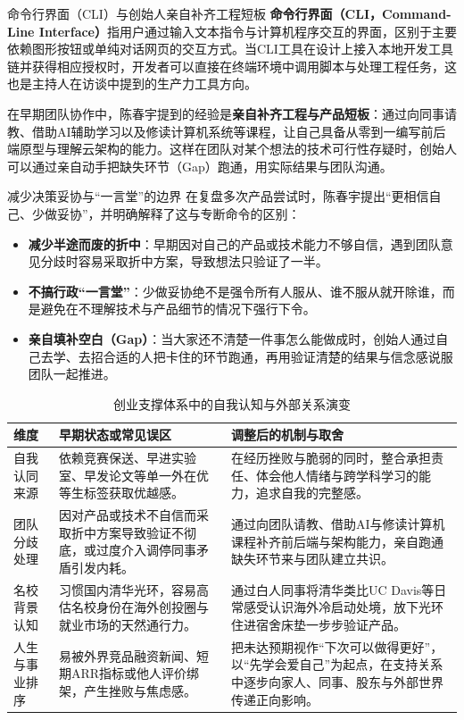\documentclass[UTF8,a4paper,11pt,fontset=fandol]{ctexart}
\begin{document}
\begin{knowledgebox}{命令行界面（CLI）与创始人亲自补齐工程短板}
\textbf{命令行界面（CLI，Command-Line Interface）}指用户通过输入文本指令与计算机程序交互的界面，区别于主要依赖图形按钮或单纯对话网页的交互方式。当CLI工具在设计上接入本地开发工具链并获得相应授权时，开发者可以直接在终端环境中调用脚本与处理工程任务，这也是主持人在访谈中提到的生产力工具方向。

在早期团队协作中，陈春宇提到的经验是\textbf{亲自补齐工程与产品短板}：通过向同事请教、借助AI辅助学习以及修读计算机系统等课程，让自己具备从零到一编写前后端原型与理解云架构的能力。这样在团队对某个想法的技术可行性存疑时，创始人可以通过亲自动手把缺失环节（Gap）跑通，用实际结果与团队沟通。
\end{knowledgebox}
\begin{importantbox}{减少决策妥协与“一言堂”的边界}
在复盘多次产品尝试时，陈春宇提出“更相信自己、少做妥协”，并明确解释了这与专断命令的区别：
\begin{itemize}
\item \textbf{减少半途而废的折中}：早期因对自己的产品或技术能力不够自信，遇到团队意见分歧时容易采取折中方案，导致想法只验证了一半。
\item \textbf{不搞行政“一言堂”}：少做妥协绝不是强令所有人服从、谁不服从就开除谁，而是避免在不理解技术与产品细节的情况下强行下令。
\item \textbf{亲自填补空白（Gap）}：当大家还不清楚一件事怎么能做成时，创始人通过自己去学、去招合适的人把卡住的环节跑通，再用验证清楚的结果与信念感说服团队一起推进。
\end{itemize}
\end{importantbox}
\begin{table}[H]\centering\small
\caption{创业支撑体系中的自我认知与外部关系演变}
\begin{tabular}{>{\raggedright\arraybackslash}p{\dimexpr(\linewidth-6\tabcolsep)/3\relax}>{\raggedright\arraybackslash}p{\dimexpr(\linewidth-6\tabcolsep)/3\relax}>{\raggedright\arraybackslash}p{\dimexpr(\linewidth-6\tabcolsep)/3\relax}}
\toprule
维度 & 早期状态或常见误区 & 调整后的机制与取舍\\\midrule
自我认同来源 & 依赖竞赛保送、早进实验室、早发论文等单一外在优等生标签获取优越感。 & 在经历挫败与脆弱的同时，整合承担责任、体会他人情绪与跨学科学习的能力，追求自我的完整感。\\[4pt]
团队分歧处理 & 因对产品或技术不自信而采取折中方案导致验证不彻底，或过度介入调停同事矛盾引发内耗。 & 通过向团队请教、借助AI与修读计算机课程补齐前后端与架构能力，亲自跑通缺失环节来与团队建立共识。\\[4pt]
名校背景认知 & 习惯国内清华光环，容易高估名校身份在海外创投圈与就业市场的天然通行力。 & 通过白人同事将清华类比UC Davis等日常感受认识海外冷启动处境，放下光环住进宿舍床垫一步步验证产品。\\[4pt]
人生与事业排序 & 易被外界竞品融资新闻、短期ARR指标或他人评价绑架，产生挫败与焦虑感。 & 把未达预期视作“下次可以做得更好”，以“先学会爱自己”为起点，在支持关系中逐步向家人、同事、股东与外部世界传递正向影响。\\[4pt]
\bottomrule\end{tabular}\end{table}
\end{document}
